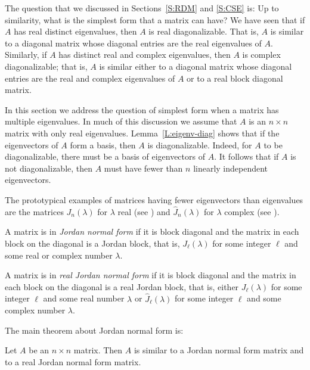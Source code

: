 \label{S:JNF}

The question that we discussed in Sections~\ref{S:RDM} and \ref{S:CSE} is: 
Up to similarity, what is the simplest form that a matrix can have?  
We have seen that if $A$ has real distinct eigenvalues, then $A$ is real 
diagonalizable.  That is, $A$ is similar to a diagonal matrix whose 
diagonal entries are the real eigenvalues of $A$.  Similarly, if $A$ has 
distinct real and complex eigenvalues, then $A$ is complex diagonalizable; 
that is, $A$ is similar either to a diagonal matrix whose diagonal entries 
are the real and complex eigenvalues of $A$ or to a real block diagonal 
matrix.

In this section we address the question of simplest form when a
matrix has multiple eigenvalues.  In much of this discussion we assume
that $A$ is an $n\times n$ matrix with only real eigenvalues.  
Lemma~\ref{L:eigenv-diag} shows that if the eigenvectors of 
$A$ form a basis, then $A$ is diagonalizable. Indeed, for $A$ to be
diagonalizable, there must be a basis of eigenvectors of $A$.  It 
follows that if $A$ is not diagonalizable, then $A$ must have fewer
than $n$ linearly independent 
eigenvectors.  

The prototypical examples of matrices having fewer eigenvectors than 
eigenvalues are the matrices $J_n(\lambda)$ for $\lambda$ real (see
) and $\widehat{J}_n(\lambda)$ for $\lambda$ complex (see
).
\begin{Def} 
A matrix is in {\em Jordan normal form\/} if it is block diagonal and 
the matrix in each block on the diagonal is a Jordan block, that is, 
$J_\ell(\lambda)$ for some integer $\ell$ and some real or complex number 
$\lambda$.  

A matrix is in {\em real Jordan normal form\/} if it is block diagonal 
and the matrix in each block on the diagonal is a real Jordan block, that is, 
either $J_\ell(\lambda)$ for some integer $\ell$ and some real number 
$\lambda$ or $\widehat{J}_\ell(\lambda)$ for some integer $\ell$ and some 
complex number $\lambda$. 
\end{Def} 


The main theorem about Jordan normal form is:
\begin{thm} \label{T:Jordan}
Let $A$ be an $n\times n$ matrix.  Then $A$ is 
similar to a Jordan normal
form matrix and to a real Jordan normal form matrix.
\end{thm}

